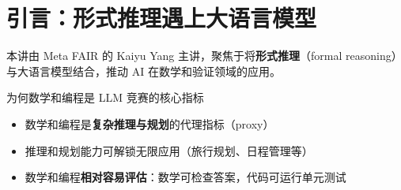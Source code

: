 \section{引言：形式推理遇上大语言模型}

本讲由 Meta FAIR 的 Kaiyu Yang 主讲，聚焦于将\textbf{形式推理}（formal reasoning）与大语言模型结合，推动 AI 在数学和验证领域的应用。

\begin{knowledgebox}{为何数学和编程是 LLM 竞赛的核心指标}
\begin{itemize}
    \item 数学和编程是\textbf{复杂推理与规划}的代理指标（proxy）
    \item 推理和规划能力可解锁无限应用（旅行规划、日程管理等）
    \item 数学和编程\textbf{相对容易评估}：数学可检查答案，代码可运行单元测试
\end{itemize}
\end{knowledgebox}

